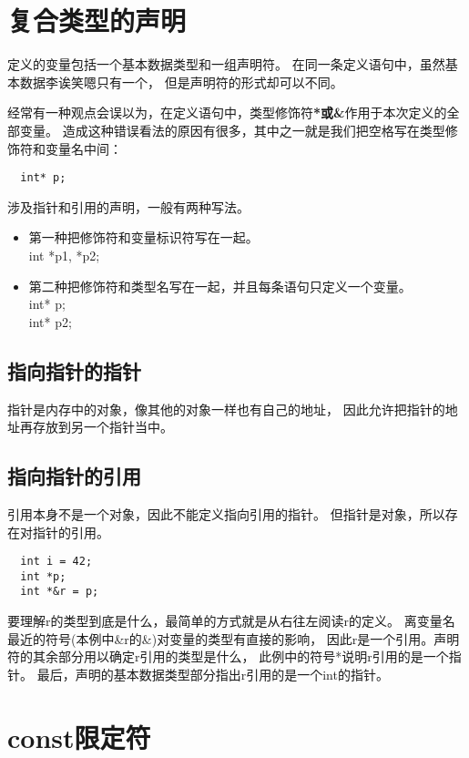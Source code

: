 \section{复合类型的声明}
定义的变量包括一个基本数据类型和一组声明符。%
在同一条定义语句中，虽然基本数据李诶笑嗯只有一个，%
但是声明符的形式却可以不同。%
\par
经常有一种观点会误以为，在定义语句中，类型修饰符{\bfseries{*或\&}}作用于本次定义的全部变量。%
造成这种错误看法的原因有很多，其中之一就是我们把空格写在类型修饰符和变量名中间：
\begin{lstlisting}
  int* p;
\end{lstlisting}
涉及指针和引用的声明，一般有两种写法。
\begin{itemize}
\item{第一种把修饰符和变量标识符写在一起。\\
    int *p1, *p2;
  }
\item{第二种把修饰符和类型名写在一起，并且每条语句只定义一个变量。\\
    int* p;\\
    int* p2;
  }
\end{itemize}
\subsection{指向指针的指针}
指针是内存中的对象，像其他的对象一样也有自己的地址，%
因此允许把指针的地址再存放到另一个指针当中。%
\subsection{指向指针的引用}
引用本身不是一个对象，因此不能定义指向引用的指针。%
但指针是对象，所以存在对指针的引用。
\begin{lstlisting}
  int i = 42;
  int *p;
  int *&r = p;
\end{lstlisting}
\par
{\color{red}要理解r的类型到底是什么，最简单的方式就是从右往左阅读r的定义。%
  离变量名最近的符号(本例中\&r的\&)对变量的类型有直接的影响，%
  因此r是一个引用。声明符的其余部分用以确定r引用的类型是什么，%
  此例中的符号*说明r引用的是一个指针。%
  最后，声明的基本数据类型部分指出r引用的是一个int的指针。
}

\section{const限定符}

  



